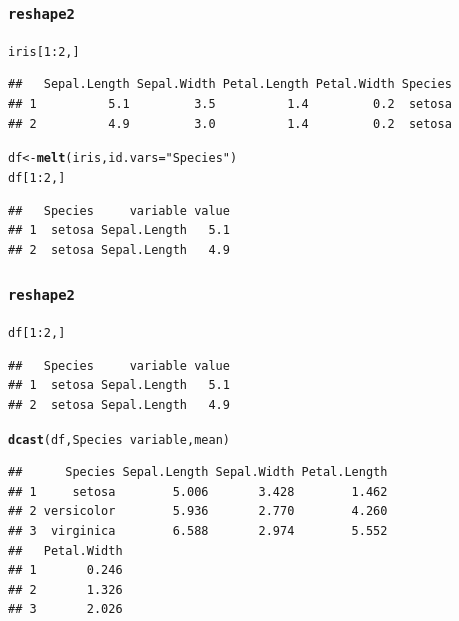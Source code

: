 \documentclass{beamer}\usepackage[]{graphicx}\usepackage[]{color}
\makeatletter
\newcommand{\hlnum}[1]{\textcolor[rgb]{0.686,0.059,0.569}{#1}}%
\newcommand{\hlstr}[1]{\textcolor[rgb]{0.192,0.494,0.8}{#1}}%
\newcommand{\hlopt}[1]{\textcolor[rgb]{0,0,0}{#1}}%
\newcommand{\hlstd}[1]{\textcolor[rgb]{0.345,0.345,0.345}{#1}}%
\newcommand{\hlkwb}[1]{\textcolor[rgb]{0.69,0.353,0.396}{#1}}%
\newcommand{\hlkwc}[1]{\textcolor[rgb]{0.333,0.667,0.333}{#1}}%
\newcommand{\hlkwd}[1]{\textcolor[rgb]{0.737,0.353,0.396}{\textbf{#1}}}%
\newenvironment{kframe}{%
 \def\at@end@of@kframe{}%
 \ifinner\ifhmode%
  \def\at@end@of@kframe{\end{minipage}}%
  \begin{minipage}{\columnwidth}%
 \fi\fi%
 \def\FrameCommand##1{\hskip\@totalleftmargin \hskip-\fboxsep
 \colorbox{shadecolor}{##1}\hskip-\fboxsep
     \hskip-\linewidth \hskip-\@totalleftmargin \hskip\columnwidth}%
 \MakeFramed {\advance\hsize-\width
   \@totalleftmargin\z@ \linewidth\hsize
   \@setminipage}}%
 {\par\unskip\endMakeFramed%
 \at@end@of@kframe}
\newenvironment{knitrout}{}{} %
\makeatother
\begin{document}
\begin{frame}[fragile]
\frametitle{\texttt{reshape2}}
\begin{knitrout}\footnotesize
{}\color{fgcolor}\begin{kframe}
\begin{alltt}
\hlstd{iris[}\hlnum{1}\hlopt{:}\hlnum{2}\hlstd{, ]}
\end{alltt}
\begin{verbatim}
##   Sepal.Length Sepal.Width Petal.Length Petal.Width Species
## 1          5.1         3.5          1.4         0.2  setosa
## 2          4.9         3.0          1.4         0.2  setosa
\end{verbatim}
\begin{alltt}
\hlstd{df}  \hlkwb{<-} \hlkwd{melt}\hlstd{(iris,} \hlkwc{id.vars} \hlstd{=} \hlstr{"Species"}\hlstd{)}
\hlstd{df[}\hlnum{1}\hlopt{:}\hlnum{2}\hlstd{, ]}
\end{alltt}
\begin{verbatim}
##   Species     variable value
## 1  setosa Sepal.Length   5.1
## 2  setosa Sepal.Length   4.9
\end{verbatim}
\end{kframe}
\end{knitrout}

\end{frame}


\begin{frame}[fragile]
\frametitle{\texttt{reshape2}}
\begin{knitrout}\footnotesize
{}\color{fgcolor}\begin{kframe}
\begin{alltt}
\hlstd{df[}\hlnum{1}\hlopt{:}\hlnum{2}\hlstd{, ]}
\end{alltt}
\begin{verbatim}
##   Species     variable value
## 1  setosa Sepal.Length   5.1
## 2  setosa Sepal.Length   4.9
\end{verbatim}
\begin{alltt}
\hlkwd{dcast}\hlstd{(df, Species} \hlopt{~} \hlstd{variable, mean)}
\end{alltt}
\begin{verbatim}
##      Species Sepal.Length Sepal.Width Petal.Length
## 1     setosa        5.006       3.428        1.462
## 2 versicolor        5.936       2.770        4.260
## 3  virginica        6.588       2.974        5.552
##   Petal.Width
## 1       0.246
## 2       1.326
## 3       2.026
\end{verbatim}
\end{kframe}
\end{knitrout}

\end{frame}
\end{document}
